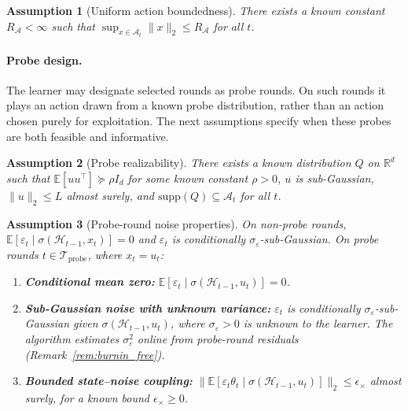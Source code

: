 \documentclass{article}
\newcommand{\R}{\mathbb{R}}
\newcommand{\E}{\mathbb{E}}
\newcommand{\cA}{\mathcal{A}}
\newcommand{\cH}{\mathcal{H}}
\newcommand{\cTprobe}{\mathcal{T}_{\mathrm{probe}}}
\newcommand{\supp}{\mathrm{supp}}
\newtheorem{assumption}{Assumption}
\begin{document}
\begin{assumption}[Uniform action boundedness]
\label{assum:action_boundedness}
There exists a known constant $R_{\cA}<\infty$ such that
$\sup_{x\in\cA_t}\|x\|_2 \le R_{\cA}$ for all $t$.
\end{assumption}

\paragraph{Probe design.}
The learner may designate selected rounds as probe rounds.
On such rounds it plays an action drawn from a known probe distribution, rather than an action chosen purely for exploitation.
The next assumptions specify when these probes are both feasible and informative.

\begin{assumption}[Probe realizability]
\label{assum:probe_realizability}
There exists a known distribution $Q$ on $\R^d$ such that
$\E[uu^\top] \succeq \rho I_d$ for some known constant $\rho>0$,
$u$ is sub-Gaussian,
$\|u\|_2 \le L$ almost surely,
and $\supp(Q)\subseteq \cA_t$ for all $t$.
\end{assumption}

\begin{assumption}[Probe-round noise properties]
\label{assum:probe_noise}
On non-probe rounds, $\E[\varepsilon_t \mid \sigma(\cH_{t-1},x_t)] = 0$ and $\varepsilon_t$ is conditionally $\sigma_\varepsilon$-sub-Gaussian.
On probe rounds $t\in \cTprobe$, where $x_t = u_t$:
\begin{enumerate}[label=(\roman*)]
    \item \textbf{Conditional mean zero:}
    $\E[\varepsilon_t \mid \sigma(\cH_{t-1},u_t)] = 0$.
    \item \textbf{Sub-Gaussian noise with unknown variance:}
    $\varepsilon_t$ is conditionally $\sigma_\varepsilon$-sub-Gaussian given $\sigma(\cH_{t-1},u_t)$, where $\sigma_\varepsilon > 0$ is \emph{unknown} to the learner. The algorithm estimates $\sigma_\varepsilon^2$ online from probe-round residuals (Remark~\ref{rem:burnin_free}).
    \item \textbf{Bounded state--noise coupling:}
    $\bigl\|\E[\varepsilon_t \theta_t \mid \sigma(\cH_{t-1},u_t)]\bigr\|_2 \le \epsilon_\times$ almost surely, for a known bound $\epsilon_\times \ge 0$.
\end{enumerate}
\end{assumption}
\end{document}
